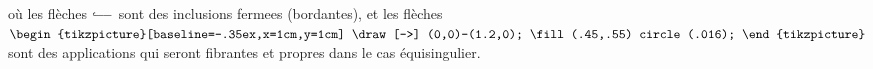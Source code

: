 où les flèches $\lhook\joinrel\relbar\joinrel\relbar$ sont des inclusions
fermees  (bordantes), et les flèches
\(\mathrel{\begin{tikzpicture}[baseline=-.35ex,x=1cm,y=1cm]
\draw[->] (0,0)--(1.2,0);
\fill (.45,.55) circle (.016);
\end{tikzpicture}}\)
sont des applications qui seront fibrantes et propres
dans le cas équisingulier.
